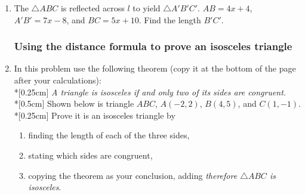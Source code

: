 \documentclass[12pt, twoside]{article}
\begin{document}
\begin{enumerate}
\item The $\triangle ABC$ is reflected across $l$ to yield $\triangle A'B'C'$. $AB=4x+4$, $A'B'=7x-8$, and $BC=5x+10$. Find the length $B'C'$. %
  \begin{flushright}
\end{flushright}

\newpage
\subsubsection*{Using the distance formula to prove an isosceles triangle}
\item In this problem use the following theorem (copy it at the bottom of the page after your calculations): \\*[0.25cm]
  \emph{A triangle is isosceles if and only two of its sides are congruent.}\\*[0.5cm]
  Shown below is triangle $ABC$, $A(-2,2)$, $B(4,5)$, and $C(1,-1)$. \\*[0.25cm]
  Prove it is an isosceles triangle by
  \begin{enumerate}
    \item finding the length of each of the three sides,
    \item stating which sides are congruent,
    \item copying the theorem as your conclusion, adding \emph{therefore $\triangle ABC$ is isosceles}.
  \end{enumerate}
  \begin{flushright} %
  \end{flushright}

\end{enumerate}
\end{document}

